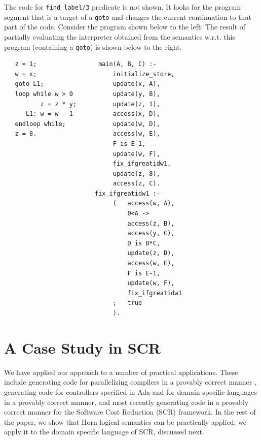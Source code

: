 \documentclass{entcs}
\begin{document}
\noindent
The code for {\tt find\_label/3} predicate is not shown.
It looks for the program segment that is a target of a
{\tt goto} and changes the current continuation to that 
part of the code.  Consider the program shown below to the left:
The result of partially evaluating the interpreter obtained from
the semantics w.r.t. this program 
(containing a {\tt goto}) is shown below to the right.

\begin{verbatim}
   z = 1;                 main(A, B, C) :-
   w = x;                     initialize_store,
   goto L1;                   update(x, A),
   loop while w > 0           update(y, B),
          z = z * y;          update(z, 1),
      L1: w = w - 1           access(x, D),
   endloop while;             update(w, D),
   z = 8.                     access(w, E),
                              F is E-1,
                              update(w, F),
                              fix_ifgreatidw1,
                              update(z, 8),
                              access(z, C).
                         fix_ifgreatidw1 :-
                              (   access(w, A),
                                  0<A ->
                                  access(z, B),
                                  access(y, C),
                                  D is B*C,
                                  update(z, D),
                                  access(w, E),
                                  F is E-1,
                                  update(w, F),
                                  fix_ifgreatidw1
                              ;   true
                              ).
\end{verbatim}

\section{A Case Study in SCR}

We have applied our approach 
to a number of practical applications. 
These include generating code for parallelizing compilers in
a provably correct manner \cite{logden}, 
generating code for controllers specified in Ada \cite{bart}
and for domain specific languages \cite{dsl} in a provably
correct manner, and most recently generating code in a provably
correct manner for the Software Cost Reduction (SCR) framework.
In the rest of the paper, we show that Horn logical
semantics can be practically applied; we apply it to the domain
specific language of SCR, discussed next.
\end{document}
